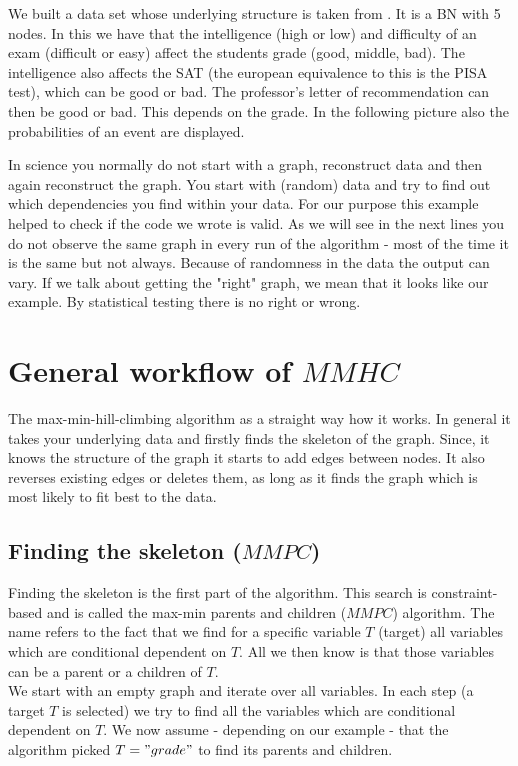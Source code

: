 		We built a data set whose underlying structure is taken from \cite{KoFr}. It is a BN with 5 nodes. In this we have that the intelligence (high or low) and difficulty of an exam (difficult or easy) affect the students grade (good, middle, bad). The intelligence also affects the SAT (the european equivalence to this is the PISA test), which can be good or bad. The professor's letter of recommendation can then be good or bad. This depends on the grade. In the following picture also the probabilities of an event are displayed.

		 \label{img.exampleGraph}

		In science you normally do not start with a graph, reconstruct data and then again reconstruct the graph. You start with (random) data and try to find out which dependencies you find within your data. For our purpose this example helped to check if the code we wrote is valid. As we will see in the next lines you do not observe the same graph in every run of the algorithm - most of the time it is the same but not always. Because of randomness in the data the output can vary. If we talk about getting the "right" graph, we mean that it looks like our example. By statistical testing there is no right or wrong.

	\section{General workflow of $MMHC$}

		The max-min-hill-climbing algorithm as a straight way how it works. In general it takes your underlying data and firstly finds the skeleton of the graph. Since, it knows the structure of the graph it starts to add edges between nodes. It also reverses existing edges or deletes them, as long as it finds the graph which is most likely to fit best to the data.

		\subsection*{Finding the skeleton ($MMPC$)}

			Finding the skeleton is the first part of the algorithm. This search is constraint-based and is called the max-min parents and children ($MMPC$) algorithm. The name refers to the fact that we find for a specific variable $T$ (target) all variables which are conditional dependent on $T$. All we then know is that those variables can be a parent or a children of $T$.\\
			We start with an empty graph and iterate over all variables. In each step (a target $T$ is selected) we try to find all the variables which are conditional dependent on $T$. We now assume - depending on our example - that the algorithm picked $T = "grade"$ to find its parents and children.

